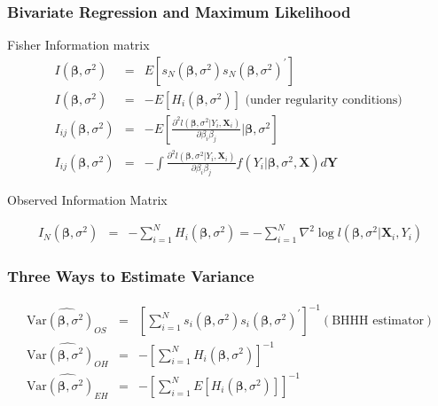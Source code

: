 \documentclass{beamer}
\begin{document}
\begin{frame}
\frametitle{Bivariate Regression and Maximum Likelihood}

Fisher Information matrix
\begin{eqnarray}
I(\boldsymbol{\beta}, \sigma^2) & = & E[ s_{N}( \boldsymbol{\beta}, \sigma^2 ) s_{N}(\boldsymbol{\beta}, \sigma^2 )^{'}] \nonumber \\
I(\boldsymbol{\beta}, \sigma^2) & = & -E[ H_{i} (\boldsymbol{\beta}, \sigma^2)]  \text{ (under regularity conditions) }\nonumber \\
I_{ij}(\boldsymbol{\beta}, \sigma^2) & = & -E[\frac{\partial^2 l(\boldsymbol{\beta}, \sigma^2| Y_{i} , \boldsymbol{X}_{i})}{\partial \beta_{i} \beta_{j} }| \boldsymbol{\beta}, \sigma^2] \nonumber \\
I_{ij}(\boldsymbol{\beta}, \sigma^2) & = & -\int \frac{\partial^2 l(\boldsymbol{\beta}, \sigma^2| Y_{i}, \boldsymbol{X}_{i})}{\partial \beta_{i} \beta_{j} } f(Y_{i}|\boldsymbol{\beta}, \sigma^2, \boldsymbol{X} )d\boldsymbol{Y} \nonumber 
\end{eqnarray}

Observed Information Matrix

\begin{eqnarray}
I_{N}(\boldsymbol{\beta}, \sigma^2) & = & -\sum_{i=1}^{N} H_{i}(\boldsymbol{\beta}, \sigma^2) = -\sum_{i=1}^{N} \nabla^2 \log l(\boldsymbol{\beta}, \sigma^2|\boldsymbol{X}_{i}, Y_{i}) \nonumber 
\end{eqnarray}


\end{frame}


\begin{frame}
\frametitle{Three Ways to Estimate Variance}

\begin{eqnarray}
\widehat{\text{Var}(\boldsymbol{\beta}, \sigma^2)_{OS}} & = & \left[\sum_{i=1}^{N}  s_{i}(\boldsymbol{\beta}, \sigma^2 ) s_{i}( \boldsymbol{\beta}, \sigma^2 )^{'}\right]^{-1} (\text{BHHH estimator} ) \nonumber \\
\widehat{\text{Var}(\boldsymbol{\beta}, \sigma^2)_{OH}} & = & - \left[\sum_{i=1}^{N} H_{i}(\boldsymbol{\beta}, \sigma^2)\right]^{-1}  \nonumber \\
\widehat{\text{Var}(\boldsymbol{\beta}, \sigma^2)_{EH}} & = & - \left[\sum_{i=1}^{N} E[H_{i}(\boldsymbol{\beta}, \sigma^2) ]\right]^{-1}\nonumber
\end{eqnarray}



\end{frame}
\end{document}
